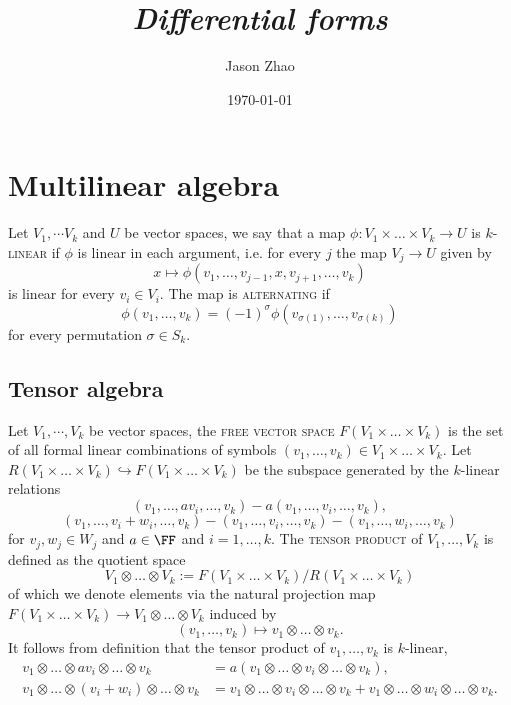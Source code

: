 \documentclass[reqno]{amsart}
\title
{
	\emph{Differential forms}
}
\author{Jason Zhao}
\date{\today}
\theoremstyle{definition}
\theoremstyle{remark}
\renewcommand{\emph}{\textsc}
\begin{document}
\maketitle
\tableofcontents

\section{Multilinear algebra}

Let $V_1, \cdots V_k$ and $U$ be vector spaces, we say that a map $\phi : V_1 \times \dots \times V_k \to U$ is \emph{$k$-linear} if $\phi$ is linear in each argument, i.e. for every $j$ the map $V_j \to U$ given by 
	\[ x \mapsto \phi(v_1, \dots, v_{j -1}, x, v_{j + 1}, \dots, v_k)  \]
is linear for every $v_i \in V_i$. The map is \emph{alternating} if
	\[ \phi (v_1, \dots, v_k) = (-1)^\sigma \phi(v_{\sigma(1)}, \dots, v_{\sigma(k)}) \]
for every permutation $\sigma \in S_k$.

\subsection{Tensor algebra}

Let $V_1, \cdots, V_k$ be vector spaces, the \emph{free vector space} $F(V_1 \times \dots \times V_k)$ is the set of all formal linear combinations of symbols $(v_1, \dots, v_k) \in V_1 \times \dots \times V_k$. Let $R(V_1 \times \dots \times V_k) \hookrightarrow F(V_1 \times \dots \times V_k)$ be the subspace generated by the $k$-linear relations
	\[		(v_1, \dots, av_i, \dots, v_k) - a(v_1, \dots, v_i, \dots, v_k), \]
	\[	
		(v_1, \dots, v_i + w_i, \dots, v_k) - (v_1, \dots, v_i, \dots, v_k) - (v_1, \dots, w_i, \dots, v_k)
	\]
for $v_j, w_j \in W_j$ and $a \in \FF$ and $i = 1, \dots, k$. The \emph{tensor product} of $V_1, \dots, V_k$ is defined as the quotient space
	\[ V_1 \otimes \dots \otimes V_k := F(V_1 \times \dots \times V_k) / R(V_1 \times \dots \times V_k)\]
of which we denote elements via the natural projection map $F(V_1 \times \dots \times V_k) \to V_1 \otimes \dots \otimes V_k$ induced by 
	\[ (v_1, \dots, v_k) \mapsto v_1 \otimes \dots \otimes v_k. \]
It follows from definition that the tensor product of $v_1, \dots, v_k$ is $k$-linear,
\begin{align*}
	v_1 \otimes \dots \otimes a v_i \otimes \dots \otimes v_k 
		&= a(v_1 \otimes \dots \otimes v_i \otimes \dots \otimes v_k), \\
	v_1 \otimes \dots \otimes (v_i + w_i) \otimes \dots \otimes v_k
		&= v_1 \otimes \dots \otimes v_i \otimes \dots \otimes v_k + v_1 \otimes \dots \otimes w_i \otimes \dots \otimes v_k. 	
\end{align*}
\end{document}

